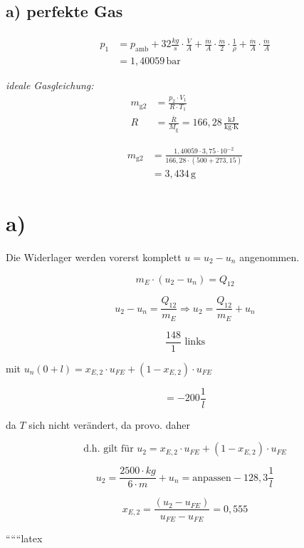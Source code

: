 \subsection*{a) perfekte Gas}

\begin{align*}
p_1 &= p_{\text{amb}} + 32 \frac{kg}{s} \cdot \frac{\dot{V}}{A} + \frac{\dot{m}}{A} \cdot \frac{\dot{m}}{2} \cdot \frac{1}{\rho} + \frac{\dot{m}}{A} \cdot \frac{\dot{m}}{A} \\
&= 1,40059 \, \text{bar}
\end{align*}

\textit{ideale Gasgleichung:}
\begin{align*}
m_{\text{g2}} &= \frac{p_2 \cdot V_1}{R \cdot T_1} \\
R &= \frac{\bar{R}}{M_{\text{g}}} = 166,28 \, \frac{\text{kJ}}{\text{kg} \cdot \text{K}}
\end{align*}

\begin{align*}
m_{\text{g2}} &= \frac{1,40059 \cdot 3,75 \cdot 10^{-2}}{166,28 \cdot (500 + 273,15)} \\
&= 3,434 \, \text{g}
\end{align*}



\section*{a)}

Die Widerlager werden vorerst komplett \( u = u_{2} - u_{n} \) angenommen.

\[
m_E \cdot (u_2 - u_n) = Q_{12}
\]

\[
u_2 - u_n = \frac{Q_{12}}{m_E} \Rightarrow u_2 = \frac{Q_{12}}{m_E} + u_n
\]

\[
\frac{148}{1} \text{ links}
\]

mit \( u_n \left(0 + l\right) = x_{E,2} \cdot u_{FE} + (1 - x_{E,2}) \cdot u_{FE} \)

\[
= -200 \frac{1}{l}
\]

da \( T \) sich nicht verändert, da \( \text{provo.} \) daher

\[
\text{d.h.} \text{ gilt für } u_2 = x_{E,2} \cdot u_{FE} + (1 - x_{E,2}) \cdot u_{FE}
\]

\[
u_2 = \frac{2500 \cdot kg}{6 \cdot m} + u_n = \text{anpassen} - 128,3 \frac{1}{l}
\]

\[
x_{E,2} = \frac{(u_2 - u_{FE})}{u_{FE} - u_{FE}} = 0,555
\]

``````latex